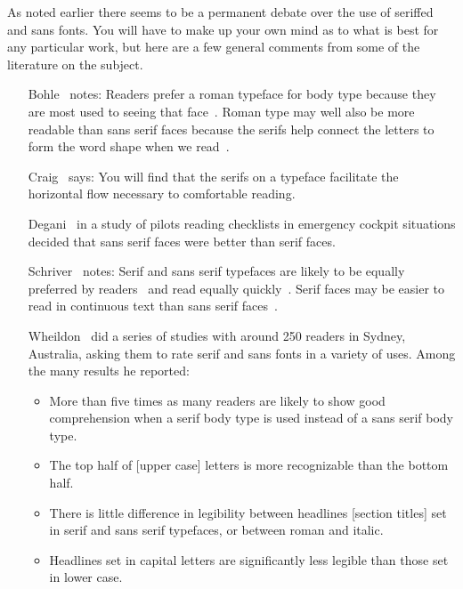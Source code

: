 \documentclass[10pt,a4paper,extrafontsizes]{memoir}
\begin{document}
\begin{paracol}{2}
\switchEng
    As noted earlier there seems to be a permanent debate over the use
of seriffed and sans fonts. You will have to make up your own mind as
to what is best for any particular work, but here are a few general
comments from some of the literature on the subject.

\begin{itemize}
\def\makelabel#1{\noindent #1}
\item[Bohle~\autocite{BOHLE90}] notes: Readers prefer a roman typeface for body
  type because they are most used to seeing that face~\autocite{REHE72}.
  Roman type may well also be more readable than sans serif faces because
  the serifs help connect the letters to form the word shape when
  we read~\autocite{REHE72}.

\item[Craig~\autocite{CRAIG92}] says: You will find that the serifs on a typeface
  facilitate the horizontal flow necessary to comfortable reading.

\item[Degani~\autocite{DEGANI92}] in a study of pilots reading checklists
  in emergency cockpit situations decided that sans serif faces were
  better than serif faces.

\item[Schriver~\autocite{SCHRIVER97}] notes: Serif and sans serif typefaces 
  are likely to be equally preferred by 
  readers~\autocite{HARTLEY83,TINKER63}
  and read equally quickly~\autocite{GOULD87,HARTLEY83,ZACHRISSOM69}.
  Serif faces may be easier to read in continuous text than sans
  serif faces~\autocite{BURT59,HVISTENDAHL75,ROBINSON71,WHEILDON95}.

\item[Wheildon~\autocite{WHEILDON95}] did a series of studies with around
250 readers in Sydney, Australia, asking them to rate serif and sans fonts
in a variety of uses. Among the many results he reported:
\begin{itemize}
  \item More than five times as many readers are likely to show good
  comprehension when a serif body type is used instead of a sans serif
  body type.
  \item The top half of [upper case] letters is more recognizable than
  the bottom half.
  \item There is little difference in legibility between headlines
  [section titles] set in serif and sans serif typefaces, or between
  roman and italic.
  \item Headlines set in capital letters are significantly less legible
  than those set in lower case.
\end{itemize}


\end{itemize}
\end{paracol}
\end{document}
